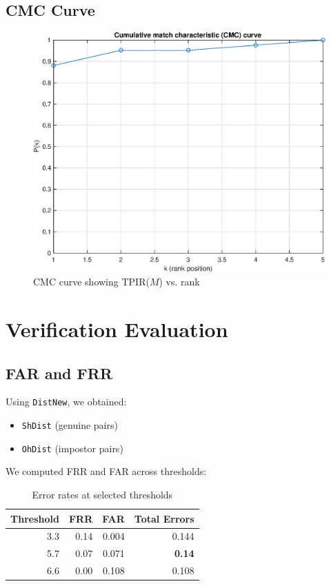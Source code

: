 \documentclass[a4paper,11pt]{article}
\begin{document}
\subsection{CMC Curve}
\begin{figure}[H]
    \centering
    \includegraphics[width=0.75\linewidth]{figures/cmc_curve.eps}
    \caption{CMC curve showing TPIR($M$) vs. rank}
\end{figure}

\section{Verification Evaluation}

\subsection{FAR and FRR}
Using \texttt{DistNew}, we obtained:
\begin{itemize}[noitemsep]
    \item \texttt{ShDist} (genuine pairs)
    \item \texttt{OhDist} (impostor pairs)
\end{itemize}
We computed FRR and FAR across thresholds:

\begin{table}[H]\centering
\caption{Error rates at selected thresholds}
\begin{tabular}{@{}rrrr@{}}
\toprule
Threshold & FRR & FAR & Total Errors \\
\midrule
3.3 & 0.14 & 0.004 & 0.144 \\
5.7 & 0.07 & 0.071 & \textbf{0.14} \\
6.6 & 0.00 & 0.108 & 0.108 \\
\bottomrule
\end{tabular}
\end{table}
\end{document}
